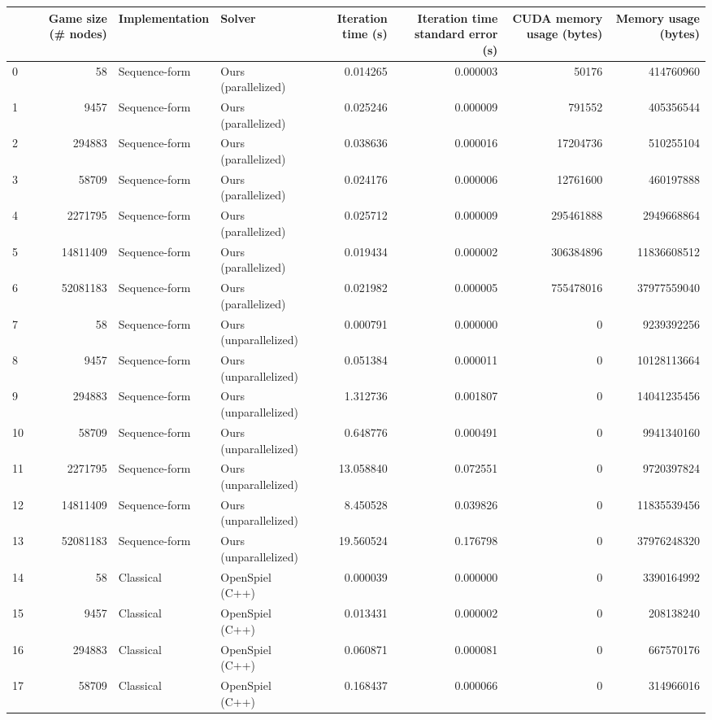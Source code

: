 \begin{tabular}{lrllrrrr}
\toprule
 & Game size (# nodes) & Implementation & Solver & Iteration time (s) & Iteration time standard error (s) & CUDA memory usage (bytes) & Memory usage (bytes) \\
\midrule
0 & 58 & Sequence-form & Ours (parallelized) & 0.014265 & 0.000003 & 50176 & 414760960 \\
1 & 9457 & Sequence-form & Ours (parallelized) & 0.025246 & 0.000009 & 791552 & 405356544 \\
2 & 294883 & Sequence-form & Ours (parallelized) & 0.038636 & 0.000016 & 17204736 & 510255104 \\
3 & 58709 & Sequence-form & Ours (parallelized) & 0.024176 & 0.000006 & 12761600 & 460197888 \\
4 & 2271795 & Sequence-form & Ours (parallelized) & 0.025712 & 0.000009 & 295461888 & 2949668864 \\
5 & 14811409 & Sequence-form & Ours (parallelized) & 0.019434 & 0.000002 & 306384896 & 11836608512 \\
6 & 52081183 & Sequence-form & Ours (parallelized) & 0.021982 & 0.000005 & 755478016 & 37977559040 \\
7 & 58 & Sequence-form & Ours (unparallelized) & 0.000791 & 0.000000 & 0 & 9239392256 \\
8 & 9457 & Sequence-form & Ours (unparallelized) & 0.051384 & 0.000011 & 0 & 10128113664 \\
9 & 294883 & Sequence-form & Ours (unparallelized) & 1.312736 & 0.001807 & 0 & 14041235456 \\
10 & 58709 & Sequence-form & Ours (unparallelized) & 0.648776 & 0.000491 & 0 & 9941340160 \\
11 & 2271795 & Sequence-form & Ours (unparallelized) & 13.058840 & 0.072551 & 0 & 9720397824 \\
12 & 14811409 & Sequence-form & Ours (unparallelized) & 8.450528 & 0.039826 & 0 & 11835539456 \\
13 & 52081183 & Sequence-form & Ours (unparallelized) & 19.560524 & 0.176798 & 0 & 37976248320 \\
14 & 58 & Classical & OpenSpiel (C++) & 0.000039 & 0.000000 & 0 & 3390164992 \\
15 & 9457 & Classical & OpenSpiel (C++) & 0.013431 & 0.000002 & 0 & 208138240 \\
16 & 294883 & Classical & OpenSpiel (C++) & 0.060871 & 0.000081 & 0 & 667570176 \\
17 & 58709 & Classical & OpenSpiel (C++) & 0.168437 & 0.000066 & 0 & 314966016 \\

\end{tabular}
